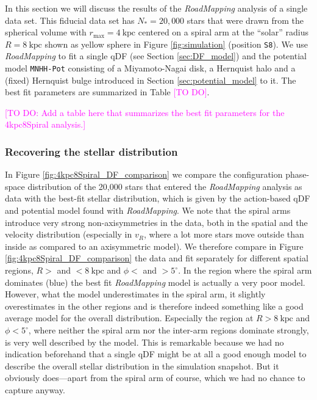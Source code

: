 \documentclass[iop,revtex4,numberedappendix,appendixfloats]{emulateapj}
\newcommand{\RM}{{\sl RoadMapping}}
\newcommand{\Wilma}[1]{\textcolor{Magenta}{#1}}
\begin{document}
In this section we will discuss the results of the \RM{} analysis of a single data set. This fiducial data set has $N_*=20,000$ stars that were drawn from the spherical volume with $r_\text{max}=4~\text{kpc}$ centered on a spiral arm at the ``solar'' radius $R=8~\text{kpc}$ shown as yellow sphere in Figure \ref{fig:simulation} (position \texttt{S8}). We use \RM{} to fit a single qDF (see Section \ref{sec:DF_model}) and the potential model \texttt{MNHH-Pot} consisting of a Miyamoto-Nagai disk, a Hernquist halo and a (fixed) Hernquist bulge introduced in Section \ref{sec:potential_model} to it. The best fit parameters are summarized in Table \Wilma{[TO DO]}.

\Wilma{[TO DO: Add a table here that summarizes the best fit parameters for the 4kpc8Spiral analysis.]}

\subsubsection{Recovering the stellar distribution} \label{sec:4kpc8Spiral_DF}

In Figure \ref{fig:4kpc8Spiral_DF_comparison} we compare the configuration phase-space distribution of the 20,000 stars that entered the \RM{} analysis as data with the best-fit stellar distribution, which is given by the action-based qDF and potential model found with \RM{}. We note that the spiral arms introduce very strong non-axisymmetries in the data, both in the spatial and the velocity distribution (especially in $v_R$, where a lot more stars move outside than inside as compared to an axisymmetric model). We therefore compare in Figure \ref{fig:4kpc8Spiral_DF_comparison} the data and fit separately for different spatial regions, $R>$ and $<8~\text{kpc}$ and $\phi<$ and $>5^\circ$. In the region where the spiral arm dominates (blue) the best fit \RM{} model is actually a very poor model. However, what the model underestimates in the spiral arm, it slightly overestimates in the other regions and is therefore indeed something like a good average model for the overall distribution. Especially the region at $R>8~\text{kpc}$ and $\phi<5^\circ$, where neither the spiral arm nor the inter-arm regions dominate strongly, is very well described by the model. This is remarkable because we had no indication beforehand that a single qDF might be at all a good enough model to describe the overall stellar distribution in the simulation snapshot. But it obviously does---apart from the spiral arm of course, which we had no chance to capture anyway.
\end{document}
